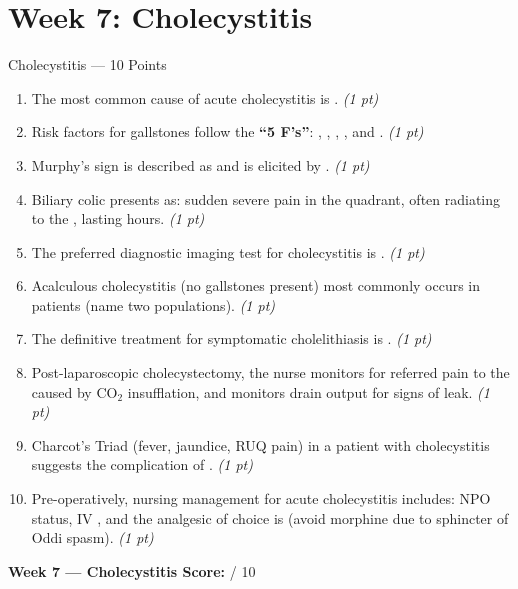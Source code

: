 \documentclass[11pt,letterpaper]{article}
\newcommand{\blank}[1][3cm]{\underline{\hspace{#1}}}
\begin{document}
\newpage

\section{Week 7: Cholecystitis}

\begin{diagbox}{Cholecystitis --- 10 Points}

\begin{enumerate}[leftmargin=1.5em, label=\textbf{\arabic*.},start=41]

  \item The most common cause of acute cholecystitis is \blank[4cm].
        \hfill\textit{(1 pt)}

  \item Risk factors for gallstones follow the \textbf{``5 F's''}:
        \blank[2.5cm], \blank[2.5cm], \blank[2.5cm], \blank[2.5cm],
        and \blank[2.5cm].
        \hfill\textit{(1 pt)}

  \item Murphy's sign is described as \blank[5cm] and is elicited by
        \blank[5cm].
        \hfill\textit{(1 pt)}

  \item Biliary colic presents as: sudden severe pain in the
        \blank[3cm] quadrant, often radiating to the
        \blank[3cm], lasting \blank[2cm] hours.
        \hfill\textit{(1 pt)}

  \item The preferred diagnostic imaging test for cholecystitis is
        \blank[3cm].
        \hfill\textit{(1 pt)}

  \item Acalculous cholecystitis (no gallstones present) most commonly occurs in
        \blank[5cm] patients (name two populations).
        \hfill\textit{(1 pt)}

  \item The definitive treatment for symptomatic cholelithiasis is
        \blank[4cm].
        \hfill\textit{(1 pt)}

  \item Post-laparoscopic cholecystectomy, the nurse monitors for referred pain to
        the \blank[3cm] caused by CO$_2$ insufflation, and monitors drain
        output for signs of \blank[3cm] leak.
        \hfill\textit{(1 pt)}

  \item Charcot's Triad (fever, jaundice, RUQ pain) in a patient with cholecystitis
        suggests the complication of \blank[4cm].
        \hfill\textit{(1 pt)}

  \item Pre-operatively, nursing management for acute cholecystitis includes:
        NPO status, IV \blank[2.5cm], and the analgesic of choice is
        \blank[3cm] (avoid morphine due to sphincter of Oddi spasm).
        \hfill\textit{(1 pt)}

\end{enumerate}

\vspace{0.3cm}
\textbf{Week 7 --- Cholecystitis Score:} \blank[1cm] / 10
\end{diagbox}
\end{document}
